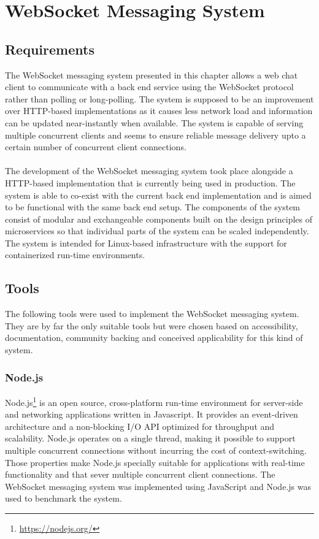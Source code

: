 \chapter{WebSocket Messaging System}
\label{chapter:websocketMessagingSystem}

\section{Requirements}

The WebSocket messaging system presented in this chapter allows a web chat client to communicate with a back end service using the WebSocket protocol rather than polling or long-polling. The system is supposed to be an improvement over HTTP-based implementations as it causes less network load and information can be updated near-instantly when available. The system is capable of serving multiple concurrent clients and seems to ensure reliable message delivery upto a certain number of concurrent client connections.
\\ \\
The development of the WebSocket messaging system took place alongside a HTTP-based implementation that is currently being used in production. The system is able to co-exist with the current back end implementation and is aimed to be functional with the same back end setup. The components of the system consist of modular and exchangeable components built on the design principles of microservices so that individual parts of the system can be scaled independently. The system is intended for Linux-based infrastructure with the support for containerized run-time environments.

\section{Tools}

The following tools were used to implement the WebSocket messaging system. They are by far the only suitable tools but were chosen based on accessibility, documentation, community backing and conceived applicability for this kind of system.

\subsection{Node.js}

Node.js\footnote{\url{https://nodejs.org/}} is an open source, cross-platform run-time environment for server-side and networking applications written in Javascript. It provides an event-driven architecture and a non-blocking I/O API optimized for throughput and scalability. Node.js operates on a single thread, making it possible to support multiple concurrent connections without incurring the cost of context-switching. Those properties make Node.js specially suitable for applications with real-time functionality and that sever multiple concurrent client connections. The WebSocket messaging system was implemented using JavaScript and Node.js was used to benchmark the system.

